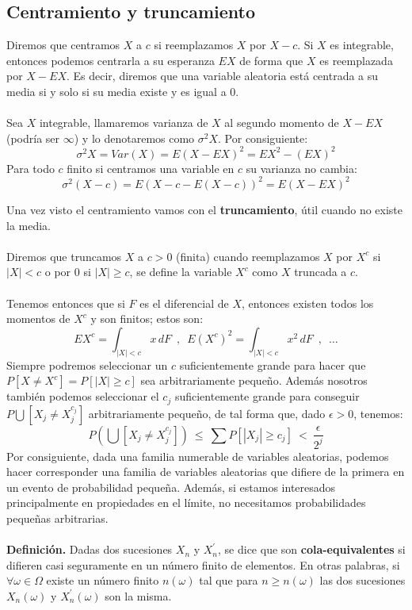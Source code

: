 \documentclass[12pt,a4paper]{book}
\begin{document}
\subsection{Centramiento y truncamiento}
Diremos que centramos $X$ a $c$ si reemplazamos $X$ por $X-c$. Si $X$ es integrable, entonces podemos centrarla a su esperanza $EX$ de forma que $X$ es reemplazada por $X-EX$. Es decir, diremos que una variable aleatoria está centrada a su media si y solo si su media existe y es igual a 0.
\\\\
Sea $X$ integrable, llamaremos varianza de $X$ al segundo momento de $X-EX$ (podría ser $\infty$) y lo denotaremos como $\sigma^2 X$. Por consiguiente:
$$\sigma^2 X = Var(X) = E(X-EX)^2=EX^2-(EX)^2$$
Para todo $c$ finito si centramos una variable en $c$ su varianza no cambia:
$$\sigma^2(X-c)=E(X-c-E(X-c))^2=E(X-EX)^2$$

Una vez visto el centramiento vamos con el \textbf{truncamiento}, útil cuando no existe la media.
\\\\
Diremos que truncamos $X$ a $c>0$ (finita) cuando reemplazamos $X$ por $X^c$ si $|X|<c$ o por $0$ si $|X|\geq c$, se define la variable $X^c$ como $X$ truncada a $c$. 
\\\\
Tenemos entonces que si $F$ es el diferencial de $X$, entonces existen todos los momentos de $X^c$ y son finitos; estos son:
$$EX^c=\int_{|X|<c}x\, dF\,\,\, , \,\,\, E(X^c)^2=\int_{|X|<c}x^2\, dF \,\,\, , \,\,\,  \ldots$$
Siempre podremos seleccionar un $c$ suficientemente grande para hacer que $P[X\neq X^c]=P[|X|\geq c]$ sea arbitrariamente pequeño. Además nosotros también podemos seleccionar el $c_j$ suficientemente grande para conseguir $P\bigcup [X_j\neq X_j^{c_j}]$ arbitrariamente pequeño, de tal forma que, dado $\epsilon > 0$, tenemos:
$$P\left( 
\bigcup [X_j\neq X_j^{c_j}] \right)
\ \leq \ 
\sum P[|X_j|\geq c_j] 
\ < \
\frac{\epsilon}{2^j}$$
Por consiguiente, dada una familia numerable de variables aleatorias, podemos hacer corresponder una familia de variables aleatorias que difiere de la primera en un evento de probabilidad pequeña. Además, si estamos interesados principalmente en propiedades en el límite, no necesitamos probabilidades pequeñas arbitrarias.
\\\\
\textbf{Definición. }Dadas dos sucesiones $X_n$ y $X_n^{\prime}$, se dice que son \textbf{cola-equivalentes} si difieren casi seguramente en un número finito de elementos.
En otras palabras, si $\forall \omega\in\Omega$ existe un número finito $n(\omega)$ tal que para $n\geq n(\omega)$ las dos sucesiones $X_n(\omega)$ y $X_n^{\prime}(\omega)$ son la misma.
\end{document}
